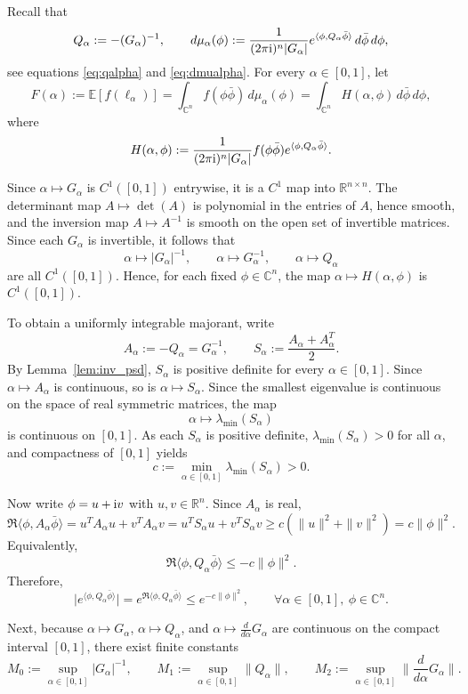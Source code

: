\documentclass[a4paper, 11pt]{article}
\newcommand{\E}{\mathbb{E}}
\newcommand{\compi}{\textnormal{i}}
\begin{document}
Recall that
\[
Q_\alpha:=-(G_\alpha)^{-1},
\qquad
d\mu_\alpha(\phi):=\frac{1}{(2\pi \compi)^n|G_\alpha|} e^{\langle \phi,Q_\alpha\bar\phi\rangle}\,d\bar\phi\,d\phi,
\]
see equations \eqref{eq:qalpha} and \eqref{eq:dmualpha}. For every $\alpha\in[0,1]$, let
\[
F(\alpha):=\E[f(\ell_\alpha)] =\int_{\mathbb C^n} f(\phi\bar\phi)\,d\mu_\alpha(\phi) =\int_{\mathbb C^n} H(\alpha,\phi)\,d\bar\phi\,d\phi,
\]
where
\[
H(\alpha,\phi):=\frac{1}{(2\pi \compi)^n|G_\alpha|} f(\phi\bar\phi)e^{\langle \phi,Q_\alpha\bar\phi\rangle}.
\]

Since $\alpha\mapsto G_\alpha$ is $C^1([0,1])$ entrywise, it is a $C^1$ map into $\mathbb R^{n\times n}$. The determinant map $A\mapsto \det(A)$ is polynomial in the entries of $A$, hence smooth, and the inversion map $A\mapsto A^{-1}$ is smooth on the open set of invertible matrices. Since each $G_\alpha$ is invertible, it follows that
\[
\alpha\mapsto |G_\alpha|^{-1},
\qquad
\alpha\mapsto G_\alpha^{-1},
\qquad
\alpha\mapsto Q_\alpha
\]
are all $C^1([0,1])$. Hence, for each fixed $\phi\in\mathbb C^n$, the map $\alpha\mapsto H(\alpha,\phi)$ is $C^1([0,1])$.

To obtain a uniformly integrable majorant, write
\[
A_\alpha:=-Q_\alpha=G_\alpha^{-1},
\qquad
S_\alpha:=\frac{A_\alpha+A_\alpha^T}{2}.
\]
By Lemma~\ref{lem:inv_psd}, $S_\alpha$ is positive definite for every $\alpha\in[0,1]$. Since $\alpha\mapsto A_\alpha$ is continuous, so is $\alpha\mapsto S_\alpha$. Since the smallest eigenvalue is continuous on the space of real symmetric matrices, the map
\[
\alpha\mapsto \lambda_{\min}(S_\alpha)
\]
is continuous on $[0,1]$. As each $S_\alpha$ is positive definite, $\lambda_{\min}(S_\alpha)>0$ for all $\alpha$, and compactness of $[0,1]$ yields
\[
c:=\min_{\alpha\in[0,1]}\lambda_{\min}(S_\alpha)>0.
\]

Now write
$\phi=u+ \compi v$ with $u,v\in\mathbb R^n$. Since $A_\alpha$ is real,
\[
\Re\langle \phi,A_\alpha\bar\phi\rangle
= u^T A_\alpha u+v^T A_\alpha v = u^T S_\alpha u+v^T S_\alpha v
\ge c(\|u\|^2+\|v\|^2)
= c\|\phi\|^2.
\]
Equivalently,
\[
\Re\langle \phi,Q_\alpha\bar\phi\rangle
\le -c\|\phi\|^2.
\]
Therefore,
\[
\big|e^{\langle \phi,Q_\alpha\bar\phi\rangle}\big|
= e^{\Re\langle \phi,Q_\alpha\bar\phi\rangle}
\le e^{-c\|\phi\|^2},
\qquad \forall \alpha\in[0,1],\ \phi\in\mathbb C^n.
\]

Next, because $\alpha\mapsto G_\alpha$, $\alpha\mapsto Q_\alpha$, and $\alpha\mapsto \frac{d}{d\alpha}G_\alpha$ are continuous on the compact interval $[0,1]$, there exist finite constants
\[
M_0:=\sup_{\alpha\in[0,1]} |G_\alpha|^{-1},\qquad M_1:=\sup_{\alpha\in[0,1]} \|Q_\alpha\|,\qquad M_2:=\sup_{\alpha\in[0,1]} \Big\|\frac{d}{d\alpha}G_\alpha\Big\|.
\]
\end{document}
